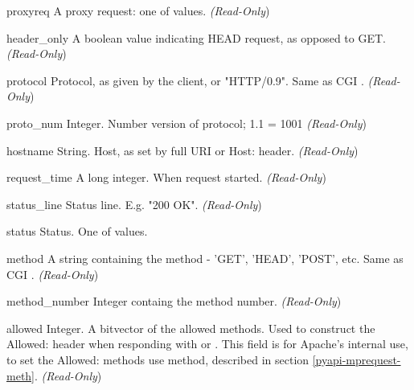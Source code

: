 \begin{memberdesc}[request]{proxyreq}
A proxy request: one of  values.
\emph{(Read-Only})
\end{memberdesc}

\begin{memberdesc}[request]{header_only}
A boolean value indicating HEAD request, as opposed to GET. 
\emph{(Read-Only})
\end{memberdesc}

\begin{memberdesc}[request]{protocol}
Protocol, as given by the client, or "HTTP/0.9". Same as CGI .
\emph{(Read-Only})
\end{memberdesc}

\begin{memberdesc}[request]{proto_num}
Integer. Number version of protocol; 1.1 = 1001 
\emph{(Read-Only})
\end{memberdesc}

\begin{memberdesc}[request]{hostname}
String. Host, as set by full URI or Host: header.
\emph{(Read-Only})
\end{memberdesc}

\begin{memberdesc}[request]{request_time}
A long integer. When request started.
\emph{(Read-Only})
\end{memberdesc}

\begin{memberdesc}[request]{status_line}
Status line. E.g. "200 OK". 
\emph{(Read-Only})
\end{memberdesc}

\begin{memberdesc}[request]{status}
Status. One of  values.
\end{memberdesc}

\begin{memberdesc}[request]{method}
A string containing the method - 'GET', 'HEAD', 'POST', etc.
Same as CGI .
\emph{(Read-Only})
\end{memberdesc}

\begin{memberdesc}[request]{method_number}
Integer containg the method number.
\emph{(Read-Only})
\end{memberdesc}

\begin{memberdesc}[request]{allowed}
Integer. A bitvector of the allowed methods. Used to construct the
Allowed: header when responding with
 or
. This field is for Apache's internal
use, to set the Allowed: methods use 
method, described in section \ref{pyapi-mprequest-meth}. 
\emph{(Read-Only})
\end{memberdesc}

